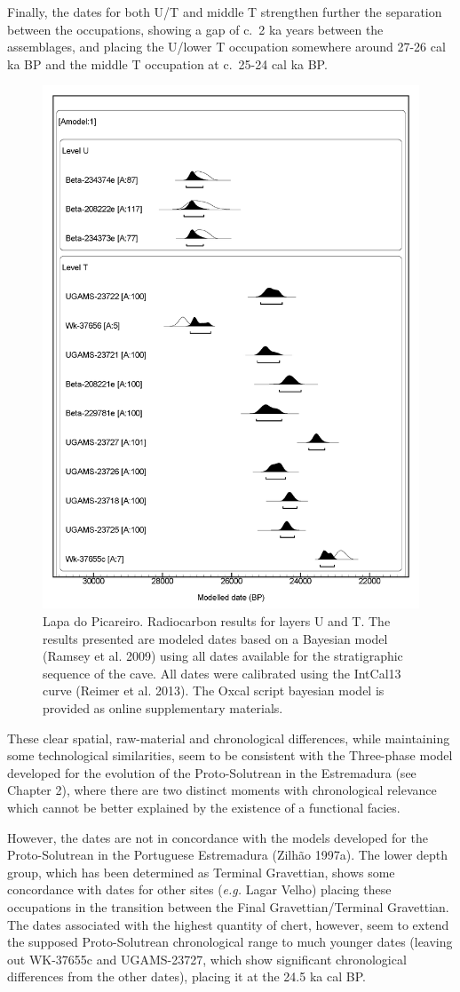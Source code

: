 \documentclass[12pt,twoside]{reedthesis}
\begin{document}
Finally, the dates for both U/T and middle T strengthen further the separation between the occupations, showing a gap of c.~2 ka years between the assemblages, and placing the U/lower T occupation somewhere around 27-26 cal ka BP and the middle T occupation at c.~25-24 cal ka BP.
\begin{figure}[H]

{\centering \includegraphics[width=0.6\linewidth]{figure/c14_LP} 

}

\caption{Lapa do Picareiro. Radiocarbon results for layers U and T. The results presented are modeled dates based on a Bayesian model (Ramsey et al. 2009) using all dates available for the stratigraphic sequence of the cave. All dates were calibrated using the IntCal13 curve (Reimer et al. 2013). The Oxcal script bayesian model is provided as online supplementary materials.}\label{fig:c14LP}
\end{figure}
These clear spatial, raw-material and chronological differences, while maintaining some technological similarities, seem to be consistent with the Three-phase model developed for the evolution of the Proto-Solutrean in the Estremadura (see Chapter 2), where there are two distinct moments with chronological relevance which cannot be better explained by the existence of a functional facies.

However, the dates are not in concordance with the models developed for the Proto-Solutrean in the Portuguese Estremadura (Zilhão 1997a). The lower depth group, which has been determined as Terminal Gravettian, shows some concordance with dates for other sites (\emph{e.g.} Lagar Velho) placing these occupations in the transition between the Final Gravettian/Terminal Gravettian. The dates associated with the highest quantity of chert, however, seem to extend the supposed Proto-Solutrean chronological range to much younger dates (leaving out WK-37655c and UGAMS-23727, which show significant chronological differences from the other dates), placing it at the 24.5 ka cal BP.
\end{document}
